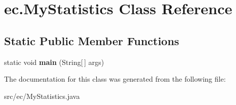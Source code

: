\hypertarget{classec_1_1_my_statistics}{}\section{ec.\+My\+Statistics Class Reference}
\label{classec_1_1_my_statistics}
\subsection*{Static Public Member Functions}
\begin{DoxyCompactItemize}
\item 
\mbox{\label{classec_1_1_my_statistics_a94ebe0fcc6975203107c041bb71b0880}} 
static void {\bfseries main} (String\mbox{[}$\,$\mbox{]} args)
\end{DoxyCompactItemize}


The documentation for this class was generated from the following file\+:\begin{DoxyCompactItemize}
\item 
src/ec/My\+Statistics.\+java\end{DoxyCompactItemize}
